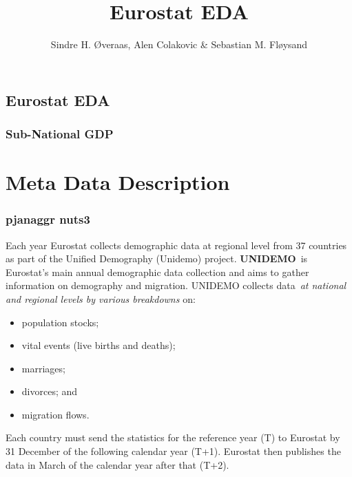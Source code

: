 \documentclass[
  letterpaper,
  DIV=11,
  numbers=noendperiod]{scrartcl}
\title{Eurostat EDA}
\author{Sindre H. Øveraas, Alen Colakovic \& Sebastian M. Fløysand}
\date{}
\begin{document}
\maketitle
\ifdefined\Shaded\renewenvironment{Shaded}{\begin{tcolorbox}[boxrule=0pt, borderline west={3pt}{0pt}{shadecolor}, breakable, interior hidden, frame hidden, enhanced, sharp corners]}{\end{tcolorbox}}\fi

\hypertarget{eurostat-eda}{%
\subsection{Eurostat EDA}\label{eurostat-eda}}

\hypertarget{sub-national-gdp}{%
\subsubsection{Sub-National GDP}\label{sub-national-gdp}}

\hypertarget{meta-data-description}{%
\section{Meta Data Description}\label{meta-data-description}}

\hypertarget{pjanaggr-nuts3}{%
\subsubsection{pjanaggr nuts3}\label{pjanaggr-nuts3}}

Each year Eurostat collects demographic data at regional level from 37
countries as part of the Unified Demography (Unidemo) project.
\textbf{UNIDEMO}~is Eurostat's main annual demographic data collection
and aims to gather information on demography and migration. UNIDEMO
collects data~\emph{at national and regional levels by various
breakdowns} on:

\begin{itemize}
\item
  population stocks;
\item
  vital events (live births and deaths);
\item
  marriages;
\item
  divorces; and
\item
  migration flows.
\end{itemize}

Each country must send the statistics for the reference year (T) to
Eurostat by 31 December of the following calendar year (T+1). Eurostat
then publishes the data in March of the calendar year after that (T+2).
\end{document}
